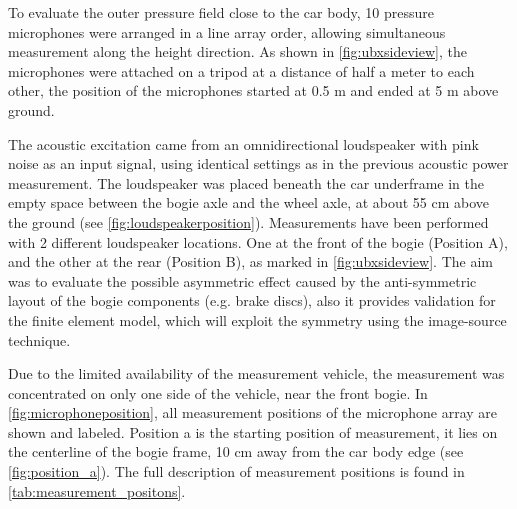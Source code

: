 To evaluate the outer pressure field close to the car body, 10 pressure microphones were arranged in a line array order, allowing simultaneous measurement along the height direction. As shown in \cref{fig:ubxsideview}, the microphones were attached on a tripod at a distance of half a meter to each other, the position of the microphones started at 0.5 m and ended at 5 m above ground.

The acoustic excitation came from an omnidirectional loudspeaker with pink noise as an input signal, using identical settings as in the previous acoustic power measurement. The loudspeaker was placed beneath the car underframe in the empty space between the bogie axle and the wheel axle, at about 55 cm above the ground (see \cref{fig:loudspeakerposition}). Measurements have been performed with 2 different loudspeaker locations. One at the front of the bogie (Position A), and the other at the rear (Position B), as marked in \cref{fig:ubxsideview}. The aim was to evaluate the possible asymmetric effect caused by the anti-symmetric layout of the bogie components (e.g. brake discs), also it provides validation for the finite element model, which will exploit the symmetry using the image-source technique.

Due to the limited availability of the measurement vehicle, the measurement was concentrated on only one side of the vehicle, near the front bogie. In \cref{fig:microphoneposition}, all measurement positions of the microphone array are shown and labeled. Position a is the starting position of measurement, it lies on the centerline of the bogie frame, 10 cm away from the car body edge (see \cref{fig:position_a}). The full description of measurement positions is found in \cref{tab:measurement_positons}.

